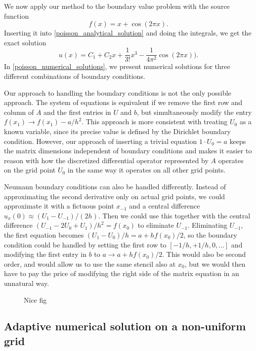 We now apply our method to the boundary value problem with the source function 
\begin{equation*}
f(x) = x + \cos(2 \pi x).
\end{equation*}
Inserting it into \cref{poisson_analytical_solution} and doing the integrals, we get the exact solution
\begin{equation*}
u(x) = C_1 + C_2 x + \frac{1}{3!}x^3 - \frac{1}{4 \pi^2}\cos(2 \pi x)).
\end{equation*}
In \cref{poisson_numerical_solutions}, we present numerical solutions for three different combinations of boundary conditions.

Our approach to handling the boundary conditions is not the only possible approach.
The system of equations is equivalent if we remove the first row and column of $A$ and the first entries in $U$ and $b$, but simultaneously modify the entry $f(x_1) \rightarrow f(x_1) - a/h^2$.
This approach is more consistent with treating $U_0$ as a known variable, since its precise value is defined by the Dirichlet boundary condition.
However, our approach of inserting a trivial equation $1 \cdot U_0 = a$ keeps the matrix dimensions independent of boundary conditions and makes it easier to reason with how the discretized differential operator represented by $A$ operates on the grid point $U_0$ in the same way it operates on all other grid points.

Neumann boundary conditions can also be handled differently.
Instead of approximating the second derivative only on actual grid points, we could approximate it with a fictuous point $x_{-1}$ and a central difference $u_x(0) \approx (U_1 - U_{-1}) / (2 h)$.
Then we could use this together with the central difference $(U_{-1} - 2 U_0 + U_1) / h^2 = f(x_0)$ to eliminate $U_{-1}$.
Eliminating $U_{-1}$, the first equation becomes $(U_1 - U_0) / h = a + h f(x_0) / 2$, so the boundary condition could be handled by setting the first row to $[-1/h, +1/h, 0, \dots]$ and modifying the first entry in $b$ to $a \rightarrow a + h f(x_0) / 2$.
This would also be second order, and would allow us to use the same stencil also at $x_0$, but we would then have to pay the price of modifying the right side of the matrix equation in an unnatural way.

\begin{figure}
  \centering
  
  \caption{Nice fig}
\end{figure}

\subsection{Adaptive numerical solution on a non-uniform grid}

